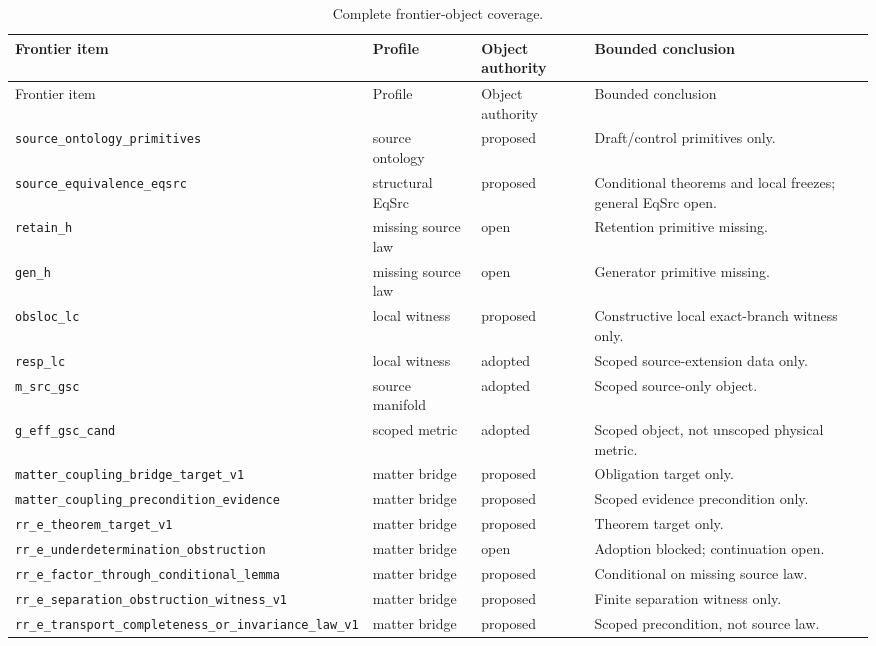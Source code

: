 \documentclass[11pt]{article}
\begin{document}
\small
\begin{longtable}{@{}p{}p{}p{}p{}@{}}
\caption{Complete frontier-object coverage.}\label{tab:objects}\\
\toprule
Frontier item & Profile & Object authority & Bounded conclusion\\
\midrule
\endfirsthead
\toprule
Frontier item & Profile & Object authority & Bounded conclusion\\
\midrule
\endhead
\texttt{source\_ontology\_primitives} & source ontology & proposed & Draft/control primitives only.\\
\texttt{source\_equivalence\_eqsrc} & structural EqSrc & proposed & Conditional theorems and local freezes; general EqSrc open.\\
\texttt{retain\_h} & missing source law & open & Retention primitive missing.\\
\texttt{gen\_h} & missing source law & open & Generator primitive missing.\\
\texttt{obsloc\_lc} & local witness & proposed & Constructive local exact-branch witness only.\\
\texttt{resp\_lc} & local witness & adopted & Scoped source-extension data only.\\
\texttt{m\_src\_gsc} & source manifold & adopted & Scoped source-only object.\\
\texttt{g\_eff\_gsc\_cand} & scoped metric & adopted & Scoped object, not unscoped physical metric.\\
\texttt{matter\_coupling\_bridge\_target\_v1} & matter bridge & proposed & Obligation target only.\\
\texttt{matter\_coupling\_precondition\_evidence} & matter bridge & proposed & Scoped evidence precondition only.\\
\texttt{rr\_e\_theorem\_target\_v1} & matter bridge & proposed & Theorem target only.\\
\texttt{rr\_e\_underdetermination\_obstruction} & matter bridge & open & Adoption blocked; continuation open.\\
\texttt{rr\_e\_factor\_through\_conditional\_lemma} & matter bridge & proposed & Conditional on missing source law.\\
\texttt{rr\_e\_separation\_obstruction\_witness\_v1} & matter bridge & proposed & Finite separation witness only.\\
\texttt{rr\_e\_transport\_completeness\_or\_invariance\_law\_v1} & matter bridge & proposed & Scoped precondition, not source law.\\

\end{longtable}
\end{document}
